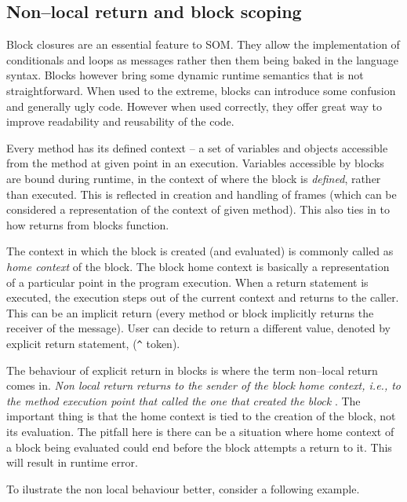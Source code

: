 \documentclass[thesis=M,english]{FITthesis}[2019/12/23]
\begin{document}
\subsection{Non--local return and block scoping}
\label{subsection:nlret}
Block closures are an essential feature to SOM. They allow the implementation of conditionals and loops as messages
rather then them being baked in the language syntax. Blocks however bring some dynamic runtime semantics that is not
straightforward. When used to the extreme, blocks can introduce some confusion and generally ugly code. However when
used correctly, they offer great way to improve readability and reusability of the code.

Every method has its defined context -- a set of variables and objects accessible from the method at given point in an
execution. Variables accessible by blocks are bound during runtime, in the context of where the block is \textit{defined},
rather than executed. This is reflected in creation and handling of frames (which can be considered a representation of
the context of given method). This also ties in to how returns from blocks function.

The context in which the block is created (and evaluated) is commonly called as \textit{home context} of the block.
The block home context is basically a representation of a particular point in the program execution. When a return
statement is executed, the execution steps out of the current context and returns to the caller. This can be
an implicit return (every method or block implicitly returns the receiver of the message). User can decide to
return a different value, denoted by explicit return statement, (\texttt{\^} token).

The behaviour of explicit return in blocks is where the term non--local return comes in. \textit{Non local return returns
to the sender of the block home context, i.e., to the method execution point that called the one that created the block}
\cite{pharo-blocks}. The important thing is that the home context is tied to the creation of the block, not its
evaluation. The pitfall here is there can be a situation where home context of a block being evaluated could end before
the block attempts a return to it. This will result in runtime error.

To ilustrate the non local behaviour better, consider a following example.

\begin{lstlisting}[language=Smalltalk]

\end{lstlisting}
\end{document}
